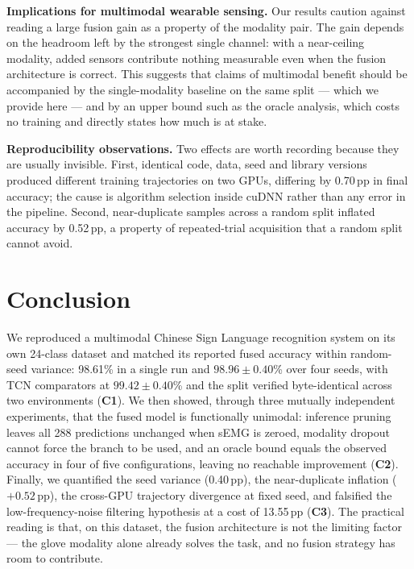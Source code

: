 \documentclass[11pt,a4paper]{article}
\begin{document}
\textbf{Implications for multimodal wearable sensing.} Our results caution against reading a large fusion gain as a property of the modality pair. The gain depends on the headroom left by the strongest single channel: with a near-ceiling modality, added sensors contribute nothing measurable even when the fusion architecture is correct. This suggests that claims of multimodal benefit should be accompanied by the single-modality baseline on the same split --- which we provide here --- and by an upper bound such as the oracle analysis, which costs no training and directly states how much is at stake.

\textbf{Reproducibility observations.} Two effects are worth recording because they are usually invisible. First, identical code, data, seed and library versions produced different training trajectories on two GPUs, differing by 0.70\,pp in final accuracy; the cause is algorithm selection inside cuDNN rather than any error in the pipeline. Second, near-duplicate samples across a random split inflated accuracy by 0.52\,pp, a property of repeated-trial acquisition that a random split cannot avoid.

\section{Conclusion}

We reproduced a multimodal Chinese Sign Language recognition system on its own 24-class dataset and matched its reported fused accuracy within random-seed variance: 98.61\% in a single run and $98.96\pm0.40$\% over four seeds, with TCN comparators at $99.42\pm0.40$\% and the split verified byte-identical across two environments (\textbf{C1}). We then showed, through three mutually independent experiments, that the fused model is functionally unimodal: inference pruning leaves all 288 predictions unchanged when sEMG is zeroed, modality dropout cannot force the branch to be used, and an oracle bound equals the observed accuracy in four of five configurations, leaving no reachable improvement (\textbf{C2}). Finally, we quantified the seed variance (0.40\,pp), the near-duplicate inflation ($+0.52$\,pp), the cross-GPU trajectory divergence at fixed seed, and falsified the low-frequency-noise filtering hypothesis at a cost of 13.55\,pp (\textbf{C3}). The practical reading is that, on this dataset, the fusion architecture is not the limiting factor --- the glove modality alone already solves the task, and no fusion strategy has room to contribute.
\end{document}
